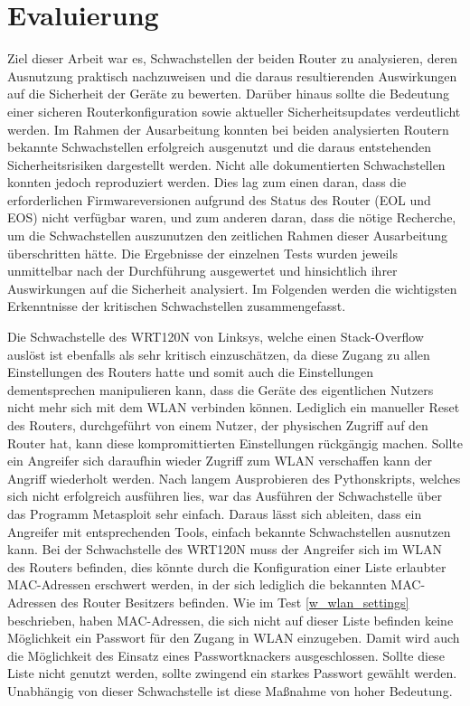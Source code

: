 	\chapter{Evaluierung}
	Ziel dieser Arbeit war es, Schwachstellen der beiden Router zu analysieren, 
	deren Ausnutzung praktisch nachzuweisen und die daraus resultierenden 
	Auswirkungen auf die Sicherheit der Geräte zu bewerten. Darüber hinaus sollte 
	die Bedeutung einer sicheren Routerkonfiguration sowie aktueller Sicherheitsupdates
	verdeutlicht werden.
	Im Rahmen der Ausarbeitung konnten bei beiden analysierten Routern bekannte 
	Schwachstellen erfolgreich ausgenutzt und die daraus entstehenden Sicherheitsrisiken 
	dargestellt werden. Nicht alle dokumentierten Schwachstellen konnten jedoch 
	reproduziert werden. Dies lag zum einen daran, dass die erforderlichen Firmwareversionen 
	aufgrund des Status des Router (EOL und EOS) nicht verfügbar waren, und zum anderen 
	daran, dass die nötige Recherche, um die Schwachstellen auszunutzen den zeitlichen 
	Rahmen dieser Ausarbeitung überschritten hätte. Die Ergebnisse der einzelnen Tests 
	wurden jeweils unmittelbar nach der Durchführung ausgewertet und hinsichtlich 
	ihrer Auswirkungen auf die Sicherheit analysiert. Im Folgenden werden die 
	wichtigsten Erkenntnisse der kritischen Schwachstellen zusammengefasst.

	Die Schwachstelle des WRT120N von Linksys, welche einen Stack-Overflow auslöst ist ebenfalls
	als sehr kritisch einzuschätzen, da diese Zugang zu allen Einstellungen des Routers hatte
	und somit auch die Einstellungen dementsprechen manipulieren kann, dass die
	Geräte des eigentlichen Nutzers nicht mehr sich mit dem WLAN verbinden
	können. Lediglich ein manueller Reset des Routers, durchgeführt von einem 
	Nutzer, der physischen Zugriff auf den Router hat, kann diese kompromittierten
	Einstellungen rückgängig machen. Sollte ein Angreifer sich daraufhin
	wieder Zugriff zum WLAN verschaffen kann der Angriff wiederholt werden.
	Nach langem Ausprobieren des Pythonskripts, welches sich nicht erfolgreich
	ausführen lies, war das Ausführen der Schwachstelle über das Programm
	Metasploit sehr einfach. Daraus lässt sich ableiten, dass ein Angreifer
	mit entsprechenden Tools, einfach bekannte Schwachstellen ausnutzen kann.
	Bei der Schwachstelle des WRT120N \cite{cverecordcve2014125122} muss der
	Angreifer sich im WLAN des Routers befinden, dies könnte durch die 
	Konfiguration einer Liste erlaubter MAC-Adressen erschwert werden, in
	der sich lediglich die bekannten MAC-Adressen des Router Besitzers 
	befinden. Wie im Test \ref{w_wlan_settings} beschrieben, haben MAC-Adressen, 
	die sich nicht auf dieser Liste befinden keine Möglichkeit ein Passwort für
	den Zugang in WLAN einzugeben. Damit wird auch die Möglichkeit des
	Einsatz eines Passwortknackers ausgeschlossen. Sollte diese Liste nicht
	genutzt werden, sollte zwingend ein starkes Passwort gewählt werden.
	Unabhängig von dieser Schwachstelle ist diese Maßnahme von hoher Bedeutung.



